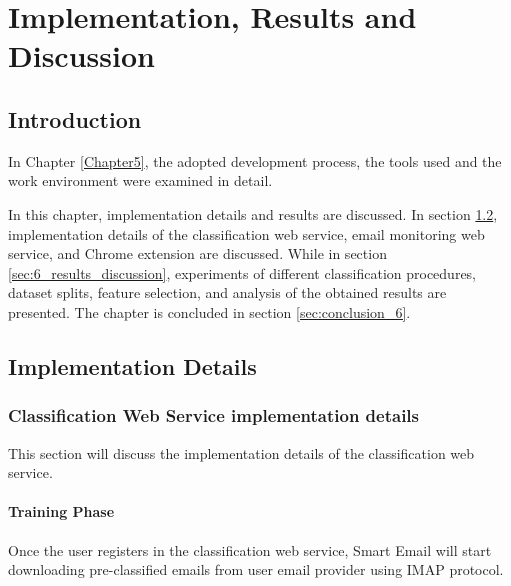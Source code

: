 
\chapter{Implementation, Results and Discussion} %

\label{Chapter6} %



\section{Introduction}
In Chapter \ref{Chapter5}, the adopted development process, the tools used and the work environment were examined in detail.

In this chapter, implementation details and results are discussed. In section
\ref{sec:6_imp_details}, implementation details of the classification web service,
email monitoring web service, and Chrome extension are discussed. While in section
\ref{sec:6_results_discussion}, experiments of different classification procedures,
dataset splits, feature selection, and analysis of the obtained results are presented. 
The chapter is concluded in section \ref{sec:conclusion_6}.

\section{Implementation Details}
\label{sec:6_imp_details}

\subsection{Classification Web Service implementation details}
This section will discuss the implementation details of the classification web service.


    \subsubsection{Training Phase}
    Once the user registers in the classification web service, Smart Email will start downloading pre-classified emails from
    user email provider using IMAP protocol.


